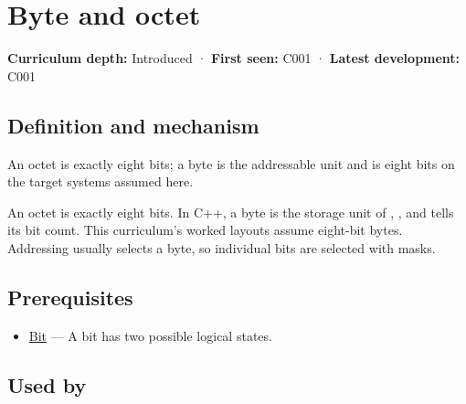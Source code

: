 \hypertarget{appendix-5bee2df85484}{}\label{referencestart:appendix-5bee2df85484}
\section{Byte and octet}\label{appendix-5bee2df85484-byte-and-octet}

\hypertarget{appendix-5bee2df85484-byte-and-octet}{}

\textbf{Curriculum depth:} Introduced · \textbf{First seen:} C001 · \textbf{Latest development:} C001

\begin{allmightroledefinition}

\subsection{Definition and mechanism}\label{appendix-5bee2df85484-definition-and-mechanism}

\hypertarget{appendix-5bee2df85484-definition-and-mechanism}{}

An octet is exactly eight bits; a byte is the addressable unit and is eight bits on the target systems assumed here.

\end{allmightroledefinition}

An octet is exactly eight bits. In C++, a byte is the storage unit of , , and  tells its bit count. This curriculum's worked layouts assume eight-bit bytes. Addressing usually selects a byte, so individual bits are selected with masks.

\subsection{Prerequisites}\label{appendix-5bee2df85484-prerequisites}

\hypertarget{appendix-5bee2df85484-prerequisites}{}

\begin{itemize}
\tightlist
\item
  \hyperref[appendix-ddbb69998a2e]{Bit} --- A bit has two possible logical states.
\end{itemize}

\subsection{Used by}\label{appendix-5bee2df85484-used-by}

